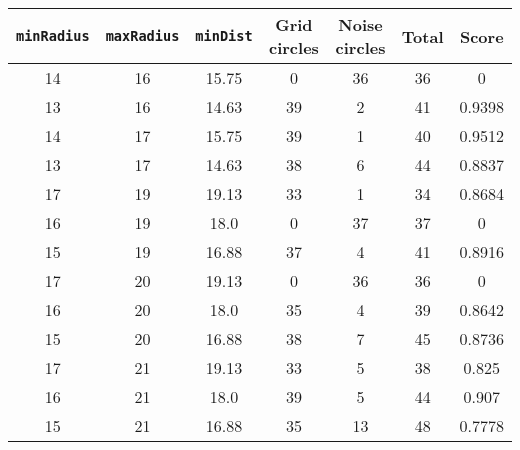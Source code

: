 \documentclass[letterpaper, 12pt]{article}
\begin{document}
\begin{longtable}{|c|c|c|c|c|c|c|}
\hline
\textbf{\texttt{minRadius}} & \textbf{\texttt{maxRadius}} & \textbf{\texttt{minDist}} & \textbf{Grid circles} & \textbf{Noise circles} & \textbf{Total} & \textbf{Score} \\
\hline
14 & 16 & 15.75 & 0 & 36 & 36 & 0 \\
\hline
13 & 16 & 14.63 & 39 & 2 & 41 & 0.9398 \\
\hline
14 & 17 & 15.75 & 39 & 1 & 40 & 0.9512 \\
\hline
13 & 17 & 14.63 & 38 & 6 & 44 & 0.8837 \\
\hline
17 & 19 & 19.13 & 33 & 1 & 34 & 0.8684 \\
\hline
16 & 19 & 18.0 & 0 & 37 & 37 & 0 \\
\hline
15 & 19 & 16.88 & 37 & 4 & 41 & 0.8916 \\
\hline
17 & 20 & 19.13 & 0 & 36 & 36 & 0 \\
\hline
16 & 20 & 18.0 & 35 & 4 & 39 & 0.8642 \\
\hline
15 & 20 & 16.88 & 38 & 7 & 45 & 0.8736 \\
\hline
17 & 21 & 19.13 & 33 & 5 & 38 & 0.825 \\
\hline
16 & 21 & 18.0 & 39 & 5 & 44 & 0.907 \\
\hline
15 & 21 & 16.88 & 35 & 13 & 48 & 0.7778 \\
\hline
\end{longtable}
\end{document}
